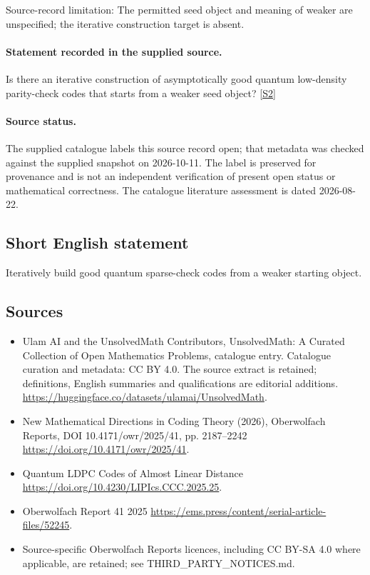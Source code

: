 \documentclass[11pt]{article}
\begin{document}
Source-record limitation: The permitted seed object and meaning of weaker are unspecified; the iterative construction target is absent.
\paragraph{Statement recorded in the supplied source.}
Is there an iterative construction of asymptotically good quantum low-density parity-check codes that starts from a weaker seed object? \href{https://doi.org/10.4171/owr/2025/41}{[S2]}
\paragraph{Source status.}
The supplied catalogue labels this source record open; that metadata was checked against the supplied snapshot on 2026-10-11. The label is preserved for provenance and is not an independent verification of present open status or mathematical correctness. The catalogue literature assessment is dated 2026-08-22.
\subsection{Short English statement}
Iteratively build good quantum sparse-check codes from a weaker starting object.
\subsection{Sources}
\begin{itemize}
\item[S1] Ulam AI and the UnsolvedMath Contributors, UnsolvedMath: A Curated Collection of Open Mathematics Problems, catalogue entry. Catalogue curation and metadata: CC BY 4.0. The source extract is retained; definitions, English summaries and qualifications are editorial additions.
\url{https://huggingface.co/datasets/ulamai/UnsolvedMath}.
\item[S2] New Mathematical Directions in Coding Theory (2026), Oberwolfach Reports, DOI 10.4171/owr/2025/41, pp. 2187--2242
\url{https://doi.org/10.4171/owr/2025/41}.
\item[S3] Quantum LDPC Codes of Almost Linear Distance
\url{https://doi.org/10.4230/LIPIcs.CCC.2025.25}.
\item[S4] Oberwolfach Report 41 2025
\url{https://ems.press/content/serial-article-files/52245}.
\item Source-specific Oberwolfach Reports licences, including CC BY-SA 4.0 where applicable, are retained; see THIRD\_PARTY\_NOTICES.md.
\end{itemize}
\end{document}
